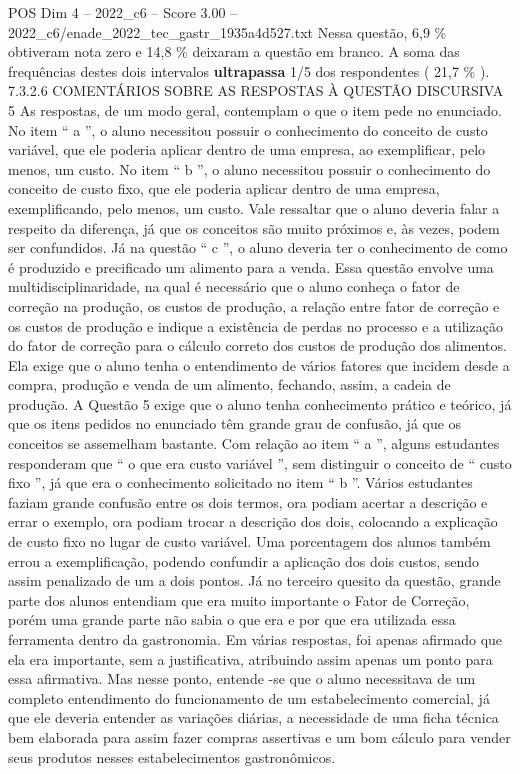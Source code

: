 \begin{textsample}{POS Dim 4 – 2022\_c6 – Score 3.00 – 2022\_c6/enade\_2022\_tec\_gastr\_1935a4d527.txt}
Nessa questão, 6,9 \% obtiveram nota zero e 14,8 \% deixaram a questão em branco.
A soma das frequências destes dois intervalos \textbf{ultrapassa} 1/5 dos respondentes ( 21,7 \% ). 7.3.2.6 COMENTÁRIOS SOBRE AS RESPOSTAS À QUESTÃO DISCURSIVA 5 As respostas, de um modo geral, contemplam o que o item pede no enunciado.
No item “ a ”, o aluno necessitou possuir o conhecimento do conceito de custo variável, que ele poderia aplicar dentro de uma empresa, ao exemplificar, pelo menos, um custo.
No item “ b ”, o aluno necessitou possuir o conhecimento do conceito de custo fixo, que ele poderia aplicar dentro de uma empresa, exemplificando, pelo menos, um custo.
Vale ressaltar que o aluno deveria falar a respeito da diferença, já que os conceitos são muito próximos e, às vezes, podem ser confundidos.
Já na questão “ c ”, o aluno deveria ter o conhecimento de como é produzido e precificado um alimento para a venda.
Essa questão envolve uma multidisciplinaridade, na qual é necessário que o aluno conheça o fator de correção na produção, os custos de produção, a relação entre fator de correção e os custos de produção e indique a existência de perdas no processo e a utilização do fator de correção para o cálculo correto dos custos de produção dos alimentos.
Ela exige que o aluno tenha o entendimento de vários fatores que incidem desde a compra, produção e venda de um alimento, fechando, assim, a cadeia de produção.
A Questão 5 exige que o aluno tenha conhecimento prático e teórico, já que os itens pedidos no enunciado têm grande grau de confusão, já que os conceitos se assemelham bastante.
Com relação ao item “ a ”, alguns estudantes responderam que “ o que era custo variável ”, sem distinguir o conceito de “ custo fixo ”, já que era o conhecimento solicitado no item “ b ”.
Vários estudantes faziam grande confusão entre os dois termos, ora podiam acertar a descrição e errar o exemplo, ora podiam trocar a descrição dos dois, colocando a explicação de custo fixo no lugar de custo variável.
Uma porcentagem dos alunos também errou a exemplificação, podendo confundir a aplicação dos dois custos, sendo assim penalizado de um a dois pontos.
Já no terceiro quesito da questão, grande parte dos alunos entendiam que era muito importante o Fator de Correção, porém uma grande parte não sabia o que era e por que era utilizada essa ferramenta dentro da gastronomia.
Em várias respostas, foi apenas afirmado que ela era importante, sem a justificativa, atribuindo assim apenas um ponto para essa afirmativa.
Mas nesse ponto, entende -se que o aluno necessitava de um completo entendimento do funcionamento de um estabelecimento comercial, já que ele deveria entender as variações diárias, a necessidade de uma ficha técnica bem elaborada para assim fazer compras assertivas e um bom cálculo para vender seus produtos nesses estabelecimentos gastronômicos.

\end{textsample}
